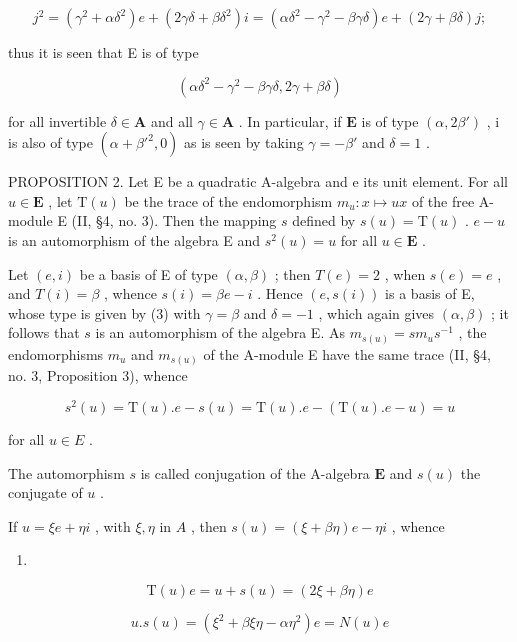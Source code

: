 \[
j ^ {2} = (\gamma^ {2} + \alpha \delta^ {2}) e + (2 \gamma \delta + \beta \delta^ {2}) i = (\alpha \delta^ {2} - \gamma^ {2} - \beta \gamma \delta) e + (2 \gamma + \beta \delta) j;
\]

thus it is seen that E is of type

\[
(\alpha \delta^ {2} - \gamma^ {2} - \beta \gamma \delta , 2 \gamma + \beta \delta)\tag{3}
\]

for all invertible \(\delta \in \mathbf{A}\) and all \(\gamma \in \mathbf{A}\) . In particular, if \(\mathbf{E}\) is of type \((\alpha, 2\beta')\) , i is also of type \((\alpha + \beta'^2, 0)\) as is seen by taking \(\gamma = -\beta'\) and \(\delta = 1\) .

PROPOSITION 2. Let E be a quadratic A-algebra and e its unit element. For all \(u \in \mathbf{E}\) , let \(\mathrm{T}(u)\) be the trace of the endomorphism \(m_u: x \mapsto ux\) of the free A-module E (II, §4, no. 3). Then the mapping \(s\) defined by \(s(u) = \mathrm{T}(u)\) . \(e - u\) is an automorphism of the algebra E and \(s^2(u) = u\) for all \(u \in \mathbf{E}\) .

Let \((e, i)\) be a basis of E of type \((\alpha, \beta)\) ; then \(T(e) = 2\) , when \(s(e) = e\) , and \(T(i) = \beta\) , whence \(s(i) = \beta e - i\) . Hence \((e, s(i))\) is a basis of E, whose type is given by (3) with \(\gamma = \beta\) and \(\delta = -1\) , which again gives \((\alpha, \beta)\) ; it follows that \(s\) is an automorphism of the algebra E. As \(m_{s(u)} = sm_u s^{-1}\) , the endomorphisms \(m_u\) and \(m_{s(u)}\) of the A-module E have the same trace (II, §4, no. 3, Proposition 3), whence

\[
s ^ {2} (u) = \mathrm{T} (u). e - s (u) = \mathrm{T} (u). e - (\mathrm{T} (u). e - u) = u
\]

for all \(u \in E\) .

The automorphism \(s\) is called conjugation of the A-algebra \(\mathbf{E}\) and \(s(u)\) the conjugate of \(u\) .

If \(u = \xi e + \eta i\) , with \(\xi, \eta\) in \(A\) , then \(s(u) = (\xi + \beta \eta)e - \eta i\) , whence

\begin{enumerate}
\def\labelenumi{(\arabic{enumi})}
\setcounter{enumi}{3}
\tightlist
\item
\end{enumerate}

\[
\mathrm{T} (u) e = u + s (u) = (2 \xi + \beta \eta) e\tag{5}
\]

\[
u. s (u) = (\xi^ {2} + \beta \xi \eta - \alpha \eta^ {2}) e = N (u) e
\]

